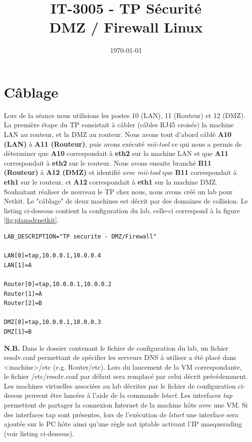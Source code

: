 \documentclass[frenchb, 11pt]{article}
\title{
	\textbf{IT-3005 - TP Sécurité}\\
	DMZ / Firewall Linux
}
\date{\today}
\begin{document}
\maketitle %
\newpage

\tableofcontents
\newpage

\section{Câblage}
Lors de la séance nous utilisions les postes 10 (LAN), 11 (Routeur) et 12 (DMZ). La première étape du TP consistait à câbler (câbles RJ45 croisés) la machine LAN au routeur, et la DMZ au routeur. Nous avons tout d'abord câblé \textbf{A10 (LAN)} à \textbf{A11 (Routeur)}, puis avons exécuté \emph{mii-tool} ce qui nous a permis de déterminer que \textbf{A10} correspondait à \textbf{eth2} sur la machine LAN et que \textbf{A11} correspondait à \textbf{eth2} sur le routeur. Nous avons ensuite branché \textbf{B11 (Routeur)} à \textbf{A12 (DMZ)} et identifié avec \emph{mii-tool} que \textbf{B11} correspondait à \textbf{eth1} sur le routeur, et \textbf{A12} correspondait à \textbf{eth1} sur la machine DMZ.\\

Souhaitant réaliser de nouveau le TP chez nous, nous avons créé un lab pour Netkit. Le "câblage" de deux machines est décrit par des domaines de collision. Le listing ci-dessous contient la configuration du lab, celle-ci correspond à la figure \ref{fig:planadrnetkit}.
\begin{lstlisting}[caption=lab.conf]
LAB_DESCRIPTION="TP securite - DMZ/Firewall"

LAN[0]=tap,10.0.0.1,10.0.0.4
LAN[1]=A

Router[0]=tap,10.0.0.1,10.0.0.2
Router[1]=A
Router[2]=B

DMZ[0]=tap,10.0.0.1,10.0.0.3
DMZ[1]=B
\end{lstlisting}
\textbf{N.B.} Dans le dossier contenant le fichier de configuration du lab, un fichier resolv.conf permettant de spécifier les serveurs DNS à utiliser a été placé dans <machine>/etc (e.g. Router/etc). Lors du lancement de la VM correspondante, le fichier /etc/resolv.conf par défaut sera remplacé par celui décrit précédemment.\\

Les machines virtuelles associées au lab décrites par le fichier de configuration ci-dessus peuvent être lancées à l'aide de la commande \emph{lstart}. Les interfaces \emph{tap} permettent de partager la connexion Internet de la machine hôte avec une VM. Si des interfaces tap sont présentes, lors de l'exécution de \emph{lstart} une interface sera ajoutée sur le PC hôte ainsi qu'une règle nat iptable activant l'IP masquerading (voir listing ci-dessous).
\end{document}
